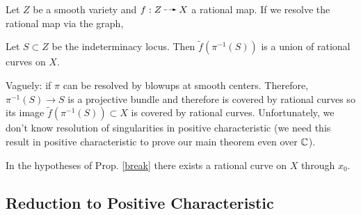\documentclass[12pt]{article}
\begin{document}
\begin{prop}
Let $Z$ be a smooth variety and $f : Z \rat X$ a rational map. If we resolve the rational map via the graph,
\begin{center}
\end{center}
Let $S \subset Z$ be the indeterminacy locus. Then $\tilde{f}(\pi^{-1}(S))$ is a union of rational curves on $X$.
\end{prop}

\begin{rmk}
Vaguely: if $\pi$ can be resolved by blowups at smooth centers. Therefore, $\pi^{-1}(S) \to S$ is a projective bundle and therefore is covered by rational curves so its image $\tilde{f}(\pi^{-1}(S)) \subset X$ is covered by rational curves. Unfortunately, we don't know resolution of singularities in positive characteristic (we need this result in positive characteristic to prove our main theorem even over $\mathbb{C}$).
\end{rmk}

\begin{cor}
In the hypotheses of Prop. \ref{break} there exists a rational curve on $X$ through $x_0$.
\end{cor}

\subsection{Reduction to Positive Characteristic}
\end{document}
